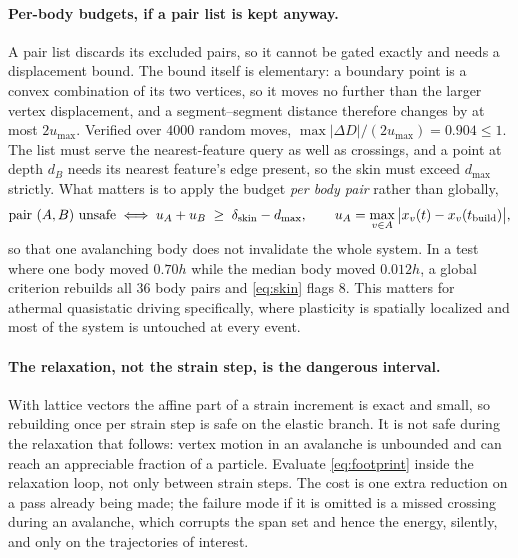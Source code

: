 \documentclass[11pt]{article}
\begin{document}
\paragraph{Per-body budgets, if a pair list is kept anyway.} A pair list discards its excluded pairs, so it cannot be gated exactly and needs a displacement bound. The bound itself is elementary: a boundary point is a convex combination of its two vertices, so it moves no further than the larger vertex displacement, and a segment--segment distance therefore changes by at most $2u_{\max}$. Verified over $4000$ random moves, $\max|\Delta D|/(2u_{\max}) = 0.904 \le 1$. The list must serve the nearest-feature query as well as crossings, and a point at depth $d_B$ needs its nearest feature's edge present, so the skin must exceed $d_{\max}$ strictly. What matters is to apply the budget \emph{per body pair} rather than globally,
\begin{equation}
\text{pair } (A,B) \text{ unsafe} \iff u_A + u_B \;\ge\; \delta_{\rm skin} - d_{\max}, \qquad
u_A = \max_{v\in A}\big|x_v(t)-x_v(t_{\rm build})\big|,
\label{eq:skin}
\end{equation}
so that one avalanching body does not invalidate the whole system. In a test where one body moved $0.70h$ while the median body moved $0.012h$, a global criterion rebuilds all $36$ body pairs and \eqref{eq:skin} flags $8$. This matters for athermal quasistatic driving specifically, where plasticity is spatially localized and most of the system is untouched at every event.

\paragraph{The relaxation, not the strain step, is the dangerous interval.} With lattice vectors the affine part of a strain increment is exact and small, so rebuilding once per strain step is safe on the elastic branch. It is not safe during the relaxation that follows: vertex motion in an avalanche is unbounded and can reach an appreciable fraction of a particle. Evaluate \eqref{eq:footprint} inside the relaxation loop, not only between strain steps. The cost is one extra reduction on a pass already being made; the failure mode if it is omitted is a missed crossing during an avalanche, which corrupts the span set and hence the energy, silently, and only on the trajectories of interest.
\end{document}
